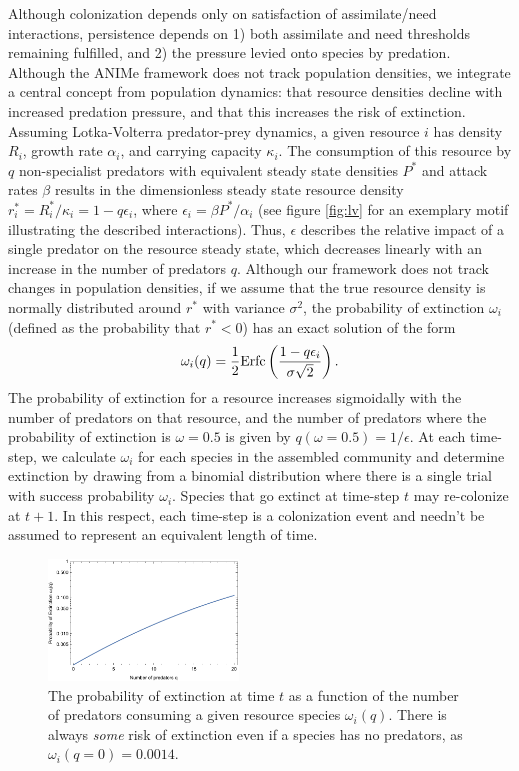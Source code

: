 \documentclass[twocolumn,preprintnumbers,amsmath,amssymb,superscriptaddress]{revtex4}
\begin{document}
Although colonization depends only on satisfaction of assimilate/need interactions, persistence depends on
1) both assimilate and need thresholds remaining fulfilled, and
2) the pressure levied onto species by predation.
Although the ANIMe framework does not track population densities, we integrate a central concept from population dynamics: that resource densities decline with increased predation pressure, and that this increases the risk of extinction.
Assuming Lotka-Volterra predator-prey dynamics, a given resource $i$ has density $R_i$, growth rate $\alpha_i$, and carrying capacity $\kappa_i$.
The consumption of this resource by $q$ non-specialist predators with equivalent steady state densities $P^*$ and attack rates $\beta$ results in the dimensionless steady state resource density $r_i^* = R_i^*/\kappa_i = 1 - q\epsilon_i$, where $\epsilon_i=\beta P^*/\alpha_i$ (see figure \ref{fig:lv} for an exemplary motif illustrating the described interactions).
Thus, $\epsilon$ describes the relative impact of a single predator on the resource steady state, which decreases linearly with an increase in the number of predators $q$.
Although our framework does not track changes in population densities, if we assume that the true resource density is normally distributed around $r^*$ with variance $\sigma^2$, the probability of extinction $\omega_i$ (defined as the probability that $r^* < 0$) has an exact solution of the form
\begin{equation}
  \omega_i(q) = \frac{1}{2}{\rm Erfc}\left(\frac{1-q\epsilon_i}{\sigma\sqrt{2}}\right).
\end{equation}
The probability of extinction for a resource increases sigmoidally with the number of predators on that resource, and the number of predators where the probability of extinction is $\omega=0.5$ is given by $q(\omega=0.5) = 1/\epsilon$.
At each time-step, we calculate $\omega_i$ for each species in the assembled community and determine extinction by drawing from a binomial distribution where there is a single trial with success probability $\omega_i$.
Species that go extinct at time-step $t$ may re-colonize at $t+1$.
In this respect, each time-step is a colonization event and needn't be assumed to represent an equivalent length of time.

\begin{figure}
\centering
\includegraphics[width=0.45\textwidth]{extinction.pdf}
\caption{
The probability of extinction at time $t$ as a function of the number of predators consuming a given resource species $\omega_i(q)$. There is always \emph{some} risk of extinction even if a species has no predators, as $\omega_i(q=0) = 0.0014$.
}
\label{fig:ext}
\end{figure} 
\end{document}

